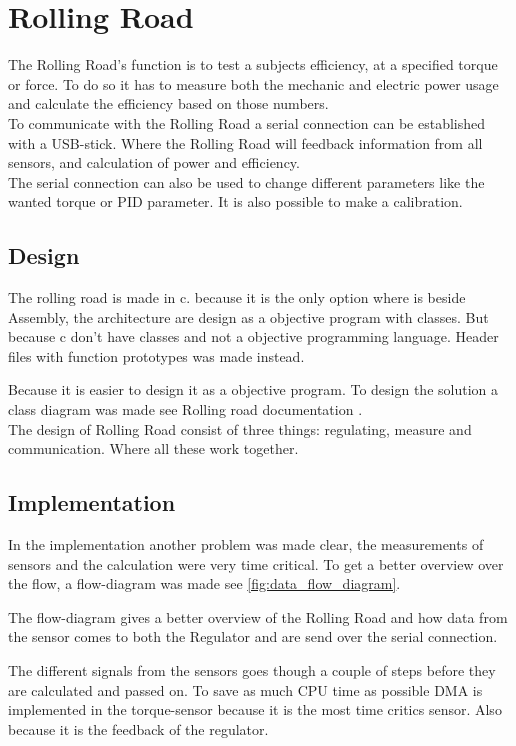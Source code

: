 \section{Rolling Road}
The Rolling Road's function is to test a subjects efficiency, at a specified torque or force. To do so it has to measure both the mechanic and electric power usage and calculate the efficiency based on those numbers.\\


To communicate with the Rolling Road a serial connection can be established with a USB-stick. Where the Rolling Road will feedback information from all sensors, and calculation of power and efficiency.\\ The serial connection can also be used to change different parameters like the wanted torque or PID parameter. It is also possible to make a calibration.

\subsection{Design}
The rolling road is made in c. because it is the only option where is beside Assembly, the architecture are design as a objective program with classes. But because c don't have classes and not a objective programming language. Header files with function prototypes was made instead. 

Because it is easier to design it as a objective program. To design the solution a class diagram was made see Rolling road documentation \cite{RR}.\\

The design of Rolling Road consist of three things: regulating, measure and communication. Where all these work together.\\

\subsection{Implementation}
In the implementation another problem was made clear, the measurements of sensors and the calculation were very time critical. To get a better overview over the flow, a flow-diagram was made see \vref{fig:data_flow_diagram}.

The flow-diagram gives a better overview of the Rolling Road and how data from the sensor comes to both the Regulator and are send over the serial connection.

The different signals from the sensors goes though a couple of steps before they are calculated and passed on. To save as much CPU time as possible DMA is implemented in the torque-sensor because it is the most time critics sensor. Also because it is the feedback of the regulator.  

